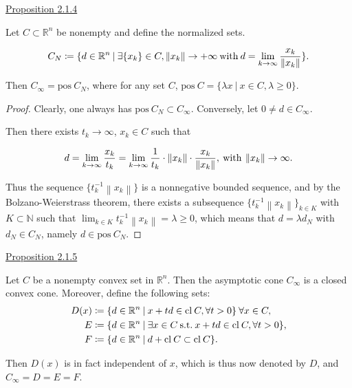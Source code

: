 \documentclass[a4paper,11pt]{jsarticle}
\newcommand{\PROPOSITION}[2]{\begin{itembox}[l]{\underline{Proposition {#1} }}{#2}\end{itembox}}
\newcommand{\NaturalNumberSet}{\mathbb{N}}
\newcommand{\NDemenstionalRealEuclidianSpace}{\mathbb{R}^n}
\newcommand{\SuchThat}{\:\text{s.t.}\:}
\begin{document}
\PROPOSITION{2.1.4}{
  Let $C \subset \NDemenstionalRealEuclidianSpace$ be nonempty and define the normalized sets.

  \begin{equation}
    C_N \coloneqq \{d \in \NDemenstionalRealEuclidianSpace \:|\: \exists \{x_k\} \in C, \left\lVert x_k \right\rVert \rightarrow +\infty \:\text{with}\: d = \lim_{k \to \infty} \frac{x_k}{\left\lVert x_k \right\rVert }\}. \notag
  \end{equation}

  Then $C_{\infty} = \text{pos}\:C_N$, where for any set $C$, $\text{pos}\:C = \{\lambda x \:|\: x \in C, \lambda \geq 0\}$.
}

\begin{proof}
  Clearly, one always has $\text{pos}\:C_N \subset C_{\infty}$. Conversely, let $0 \ne d \in C_{\infty}$.

  Then there exists $t_k \rightarrow \infty$, $x_k \in C$ such that

  \begin{equation}
    d = \lim_{k \to \infty} \frac{x_k}{t_k} = \lim_{k \to \infty} \frac{1}{t_k} \cdot \left\lVert x_k \right\rVert \cdot \frac{x_k}{\left\lVert x_k \right\rVert }, \:\text{with}\: \left\lVert x_k \right\rVert \rightarrow \infty. \notag
  \end{equation}

  Thus the sequence $\{t_k^{-1}\left\lVert x_k \right\rVert \}$ is a nonnegative bounded sequence, and by the Bolzano-Weierstrass theorem, there exists a subsequence $\{t_k^{-1}\left\lVert x_k \right\rVert\}_{k \in K}$ with $K \subset \NaturalNumberSet$ such that $\lim_{k \in K} t_k^{-1} \left\lVert x_k \right\rVert = \lambda \geq 0$, which means that $d = \lambda d_N$ with $d_N \in C_N$, namely $d \in \text{pos}\:C_N$.
\end{proof}

\PROPOSITION{2.1.5}{
  Let $C$ be a nonempty convex set in $\NDemenstionalRealEuclidianSpace$. Then the asymptotic cone $C_{\infty}$ is a closed convex cone. Moreover, define the following sets:
  \begin{equation}
    \begin{split}
      D(x) &\coloneqq \{d \in \NDemenstionalRealEuclidianSpace \:|\: x + td \in \text{cl}\:C, \forall t >0\}\: \forall x \in C, \\
      E &\coloneqq \{d \in \NDemenstionalRealEuclidianSpace \:|\: \exists x \in C \SuchThat x + td \in \text{cl}\:C, \forall t > 0\}, \\
      F &\coloneqq \{d \in \NDemenstionalRealEuclidianSpace \:|\: d + \text{cl}\:C \subset \text{cl}\:C\}. \notag
    \end{split}
  \end{equation}

  Then $D(x)$ is in fact independent of $x$, which is thus now denoted by $D$, and $C_{\infty} = D = E = F$.
}
\end{document}
